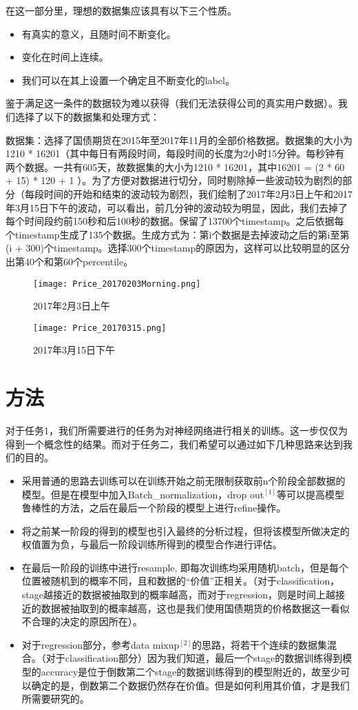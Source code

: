 \documentclass{article}
\begin{document}
在这一部分里，理想的数据集应该具有以下三个性质。

\begin{itemize}
    \item 有真实的意义，且随时间不断变化。
    \item 变化在时间上连续。
    \item 我们可以在其上设置一个确定且不断变化的label。
\end{itemize}

鉴于满足这一条件的数据较为难以获得（我们无法获得公司的真实用户数据）。我们选择了以下的数据集和处理方式：

数据集：选择了国债期货在2015年至2017年11月的全部价格数据。数据集的大小为1210 * 16201（其中每日有两段时间，每段时间的长度为2小时15分钟。每秒钟有两个数据。一共有605天，故数据集的大小为1210 * 16201，其中16201 = (2 * 60 + 15) * 120 + 1 ）。为了方便对数据进行切分，同时剔除掉一些波动较为剧烈的部分（每段时间的开始和结束的波动较为剧烈，我们绘制了2017年2月3日上午和2017年3月15日下午的波动，可以看出，前几分钟的波动较为明显，因此，我们去掉了每个时间段约前150秒和后100秒的数据。保留了13700个timestamp。之后依据每个timestamp生成了135个数据。生成方式为：第i个数据是去掉波动之后的第i至第(i + 300)个timestamp。选择300个timestamp的原因为，这样可以比较明显的区分出第40个和第60个percentile。
\begin{figure}
\centering
\texttt{[image: Price\_20170203Morning.png]}
\caption{2017年2月3日上午}
\texttt{[image: Price\_20170315.png]}
\caption{2017年3月15日下午}

\end{figure}

\section{方法}

对于任务1，我们所需要进行的任务为对神经网络进行相关的训练。这一步仅仅为得到一个概念性的结果。而对于任务二，我们希望可以通过如下几种思路来达到我们的目的。

\begin{itemize}
    \item 采用普通的思路去训练可以在训练开始之前无限制获取前n个阶段全部数据的模型。但是在模型中加入Batch\_normalization，drop out$^{[1]}$等可以提高模型鲁棒性的方法，之后在最后一个阶段的模型上进行refine操作。
    \item 将之前某一阶段的得到的模型也引入最终的分析过程，但将该模型所做决定的权值置为负，与最后一阶段训练所得到的模型合作进行评估。
    \item 在最后一阶段的训练中进行resample, 即每次训练均采用随机batch，但是每个位置被随机到的概率不同，且和数据的“价值”正相关。（对于classification，stage越接近的数据被抽取到的概率越高，而对于regression，则是时间上越接近的数据被抽取到的概率越高，这也是我们使用国债期货的价格数据这一看似不合理的决定的原因所在）。
    \item 对于regression部分，参考data mixup$^{[2]}$的思路，将若干个连续的数据集混合。（对于classification部分）因为我们知道，最后一个stage的数据训练得到模型的accuracy是位于倒数第二个stage的数据训练得到的模型附近的，故至少可以确定的是，倒数第二个数据仍然存在价值。但是如何利用其价值，才是我们所需要研究的。
\end{itemize}
\end{document}
